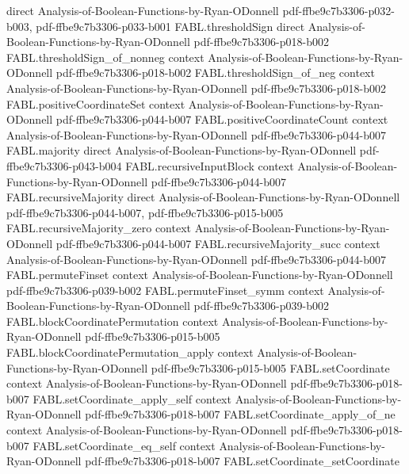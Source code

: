 \begin{theorem}
  {direct}
  {Analysis-of-Boolean-Functions-by-Ryan-ODonnell}
  {pdf-ffbe9c7b3306-p032-b003,
    pdf-ffbe9c7b3306-p033-b001}
\proofstep
  {FABL.thresholdSign}
  {direct}
  {Analysis-of-Boolean-Functions-by-Ryan-ODonnell}
  {pdf-ffbe9c7b3306-p018-b002}
\proofstep
  {FABL.thresholdSign_of_nonneg}
  {context}
  {Analysis-of-Boolean-Functions-by-Ryan-ODonnell}
  {pdf-ffbe9c7b3306-p018-b002}
\proofstep
  {FABL.thresholdSign_of_neg}
  {context}
  {Analysis-of-Boolean-Functions-by-Ryan-ODonnell}
  {pdf-ffbe9c7b3306-p018-b002}
\proofstep
  {FABL.positiveCoordinateSet}
  {context}
  {Analysis-of-Boolean-Functions-by-Ryan-ODonnell}
  {pdf-ffbe9c7b3306-p044-b007}
\proofstep
  {FABL.positiveCoordinateCount}
  {context}
  {Analysis-of-Boolean-Functions-by-Ryan-ODonnell}
  {pdf-ffbe9c7b3306-p044-b007}
\proofstep
  {FABL.majority}
  {direct}
  {Analysis-of-Boolean-Functions-by-Ryan-ODonnell}
  {pdf-ffbe9c7b3306-p043-b004}
\proofstep
  {FABL.recursiveInputBlock}
  {context}
  {Analysis-of-Boolean-Functions-by-Ryan-ODonnell}
  {pdf-ffbe9c7b3306-p044-b007}
\proofstep
  {FABL.recursiveMajority}
  {direct}
  {Analysis-of-Boolean-Functions-by-Ryan-ODonnell}
  {pdf-ffbe9c7b3306-p044-b007,
    pdf-ffbe9c7b3306-p015-b005}
\proofstep
  {FABL.recursiveMajority_zero}
  {context}
  {Analysis-of-Boolean-Functions-by-Ryan-ODonnell}
  {pdf-ffbe9c7b3306-p044-b007}
\proofstep
  {FABL.recursiveMajority_succ}
  {context}
  {Analysis-of-Boolean-Functions-by-Ryan-ODonnell}
  {pdf-ffbe9c7b3306-p044-b007}
\proofstep
  {FABL.permuteFinset}
  {context}
  {Analysis-of-Boolean-Functions-by-Ryan-ODonnell}
  {pdf-ffbe9c7b3306-p039-b002}
\proofstep
  {FABL.permuteFinset_symm}
  {context}
  {Analysis-of-Boolean-Functions-by-Ryan-ODonnell}
  {pdf-ffbe9c7b3306-p039-b002}
\proofstep
  {FABL.blockCoordinatePermutation}
  {context}
  {Analysis-of-Boolean-Functions-by-Ryan-ODonnell}
  {pdf-ffbe9c7b3306-p015-b005}
\proofstep
  {FABL.blockCoordinatePermutation_apply}
  {context}
  {Analysis-of-Boolean-Functions-by-Ryan-ODonnell}
  {pdf-ffbe9c7b3306-p015-b005}
\proofstep
  {FABL.setCoordinate}
  {context}
  {Analysis-of-Boolean-Functions-by-Ryan-ODonnell}
  {pdf-ffbe9c7b3306-p018-b007}
\proofstep
  {FABL.setCoordinate_apply_self}
  {context}
  {Analysis-of-Boolean-Functions-by-Ryan-ODonnell}
  {pdf-ffbe9c7b3306-p018-b007}
\proofstep
  {FABL.setCoordinate_apply_of_ne}
  {context}
  {Analysis-of-Boolean-Functions-by-Ryan-ODonnell}
  {pdf-ffbe9c7b3306-p018-b007}
\proofstep
  {FABL.setCoordinate_eq_self}
  {context}
  {Analysis-of-Boolean-Functions-by-Ryan-ODonnell}
  {pdf-ffbe9c7b3306-p018-b007}
\proofstep
  {FABL.setCoordinate_setCoordinate}

\end{theorem}

